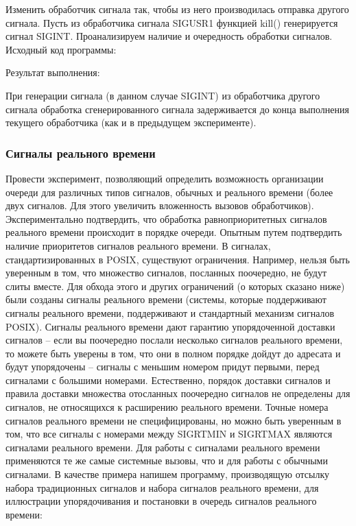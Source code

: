 \documentclass[a4paper]{article}
\begin{document}
	Изменить обработчик сигнала так, чтобы из него производилась отправка другого сигнала. Пусть из обработчика сигнала SIGUSR1 функцией kill() генерируется сигнал SIGINT. Проанализируем наличие и очередность обработки сигналов.	
	Исходный код программы:
	
	
	Результат выполнения:
	
	
	При генерации сигнала (в данном случае SIGINT) из обработчика другого сигнала обработка сгенерированного сигнала задерживается до конца выполнения текущего обработчика (как и в предыдущем эксперименте).

	\subsubsection{Сигналы реального времени}
	Провести эксперимент, позволяющий определить возможность организации очереди для различных типов сигналов, обычных и реального времени (более двух сигналов. Для этого увеличить вложенность вызовов обработчиков).
	Экспериментально подтвердить, что обработка равноприоритетных сигналов реального времени происходит в порядке очереди.
	Опытным путем подтвердить наличие приоритетов сигналов реального времени.
	В сигналах, стандартизированных в POSIX, существуют ограничения. Например, нельзя быть уверенным в том, что множество сигналов, посланных поочередно, не будут слиты вместе.
	Для обхода этого и других ограничений (о которых сказано ниже) были созданы сигналы реального времени (системы, которые поддерживают сигналы реального времени, поддерживают и стандартный механизм сигналов POSIX).
	Сигналы реального времени дают гарантию упорядоченной доставки сигналов – если вы поочередно послали несколько сигналов реального времени, то можете быть уверены в том, что они в полном порядке дойдут до адресата и будут упорядочены – сигналы с меньшим номером придут первыми, перед сигналами с большими номерами. 
	Естественно, порядок доставки сигналов и правила доставки множества отосланных поочередно сигналов не определены для сигналов, не относящихся к расширению реального времени. 
	Точные номера сигналов реального времени не специфицированы, но можно быть уверенным в том, что все сигналы с номерами между SIGRTMIN и SIGRTMAX являются сигналами реального времени. 
	Для работы с сигналами реального времени применяются те же самые системные вызовы, что и для работы с обычными сигналами. 
	В качестве примера напишем программу, производящую отсылку набора традиционных сигналов и набора сигналов реального времени, для иллюстрации упорядочивания и постановки в очередь сигналов реального времени:
\end{document}
